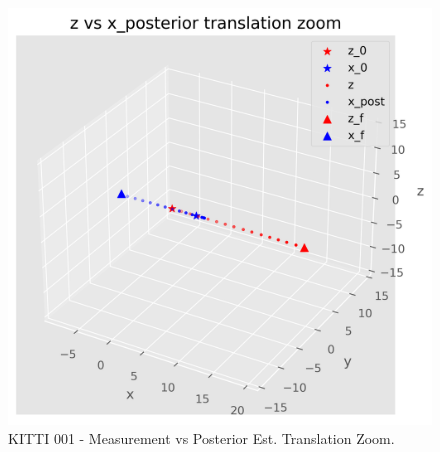 \documentclass[11pt]{article}
\begin{document}
\begin{itemize}
      \begin{figure}
            \includegraphics[width=\linewidth]{fig02.png}
            \caption{KITTI 001 - Measurement vs Posterior Est. Translation Zoom.}
            \label{fig:meas_vs_post_zoom}
      \end{figure}


\end{itemize}
\end{document}

